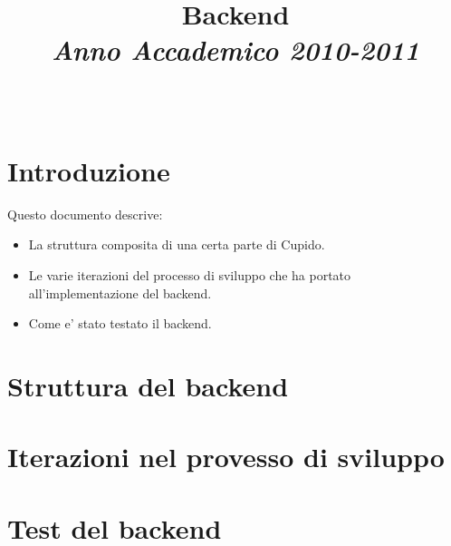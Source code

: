 \documentclass[10pt]{article}
\title{Backend\\[2mm]{\small\emph{Anno Accademico 2010-2011}}\\[4mm]}
\author{\Nome\ \Cognome}
\begin{document}
\maketitle

\tableofcontents

\section{Introduzione}
Questo documento descrive:
\begin{itemize}
  \item 
    La struttura composita di una certa parte di Cupido.
  \item
    Le varie iterazioni del processo di sviluppo che ha portato all'implementazione del backend.
  \item
    Come e' stato testato il backend.
\end{itemize}


\section{Struttura del backend}
\section{Iterazioni nel provesso di sviluppo}
\section{Test del backend}

\printindex
\end{document}
